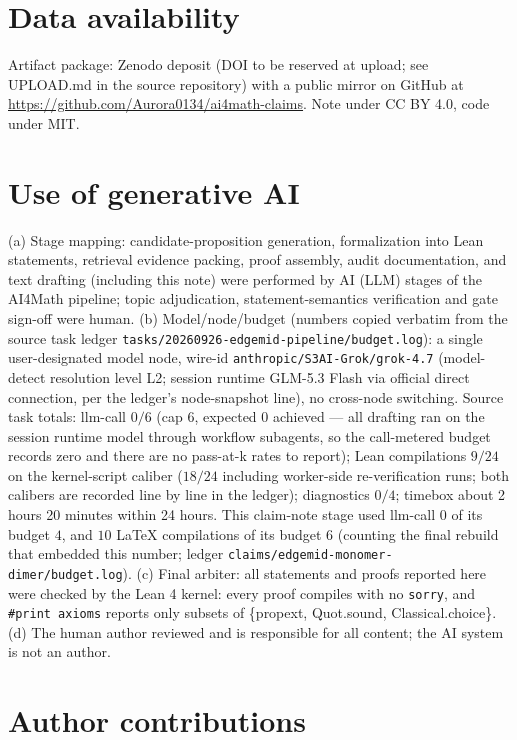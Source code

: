 \documentclass[11pt]{article}
\begin{document}
\section*{Data availability}

Artifact package: Zenodo deposit (DOI to be reserved at upload;
see UPLOAD.md in the source repository) with a public mirror on GitHub at
\url{https://github.com/Aurora0134/ai4math-claims}. Note under CC BY 4.0,
code under MIT.

\section*{Use of generative AI}

(a) Stage mapping: candidate-proposition generation, formalization into Lean
statements, retrieval evidence packing, proof assembly, audit documentation,
and text drafting (including this note) were performed by AI (LLM) stages of
the AI4Math pipeline; topic adjudication, statement-semantics verification
and gate sign-off were human. (b) Model/node/budget (numbers copied verbatim
from the source task ledger \texttt{tasks/20260926-edgemid-pipeline/budget.log}):
a single user-designated model node, wire-id
\texttt{anthropic/S3AI-Grok/grok-4.7} (model-detect resolution level L2;
session runtime GLM-5.3 Flash via official direct connection, per the
ledger's node-snapshot line), no cross-node switching. Source task totals:
llm-call $0/6$ (cap 6, expected 0 achieved --- all drafting ran on the
session runtime model through workflow subagents, so the call-metered budget
records zero and there are no pass-at-k rates to report); Lean compilations
$9/24$ on the kernel-script caliber ($18/24$ including worker-side
re-verification runs; both calibers are recorded line by line in the ledger);
diagnostics $0/4$; timebox about 2 hours 20 minutes within 24 hours. This
claim-note stage used llm-call $0$ of its budget $4$, and $10$ LaTeX
compilations of its budget $6$ (counting the final rebuild that embedded this
number; ledger \texttt{claims/edgemid-monomer-dimer/budget.log}). (c) Final
arbiter: all statements and proofs reported here were checked by the Lean 4
kernel: every proof compiles with no \texttt{sorry}, and \texttt{\#print
axioms} reports only subsets of \{propext, Quot.sound, Classical.choice\}.
(d) The human author reviewed and is responsible for all content; the AI
system is not an author.

\section*{Author contributions}
\end{document}
